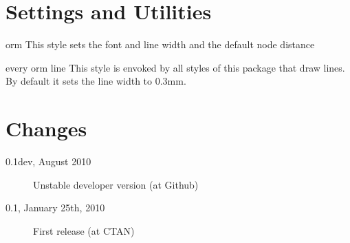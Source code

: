 \documentclass[a4paper,10pt]{article}
\def\ormVersion{0.1dev}
\def\ormDate{August 2010}
\newif\ifappendix
\begin{document}
\section{Settings and Utilities}
\label{sec:generalstyles}

\begin{stylekey}{orm}
  This style sets the font and line width and the default node distance
\end{stylekey}

\begin{stylekey}{every orm line}
  This style is envoked by all styles of this package that draw lines. By default it sets the line width to 0.3mm.
\end{stylekey}



\section*{Changes}

\begin{description}
  \item[\ormVersion, \ormDate]
    Unstable developer version (at Github)
  \item[0.1, January 25th, 2010]
    First release (at CTAN)
\end{description}

\ifappendix
  
  \addcontentsline{toc}{section}{References}
  
  \addcontentsline{toc}{section}{Index}
  \printindex
\fi
\end{document}

